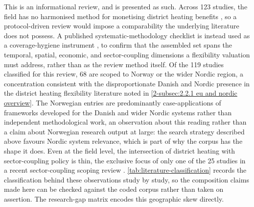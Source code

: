 This is an informational review, and is presented as such. Across 123 studies, the field has no harmonised method for monetising district heating benefits \cite{ahmed_district_2025}, so a protocol-driven review would impose a comparability the underlying literature does not possess. A published systematic-methodology checklist is instead used as a coverage-hygiene instrument \cite{atabaki_systematic_2025}, to confirm that the assembled set spans the temporal, spatial, economic, and sector-coupling dimensions a flexibility valuation must address, rather than as the review method itself. Of the 119 studies classified for this review, 68 are scoped to Norway or the wider Nordic region, a concentration consistent with the disproportionate Danish and Nordic presence in the district heating flexibility literature noted in \autoref{2-subsec:2.2.1 eu and nordic overview}. The Norwegian entries are predominantly case-applications of frameworks developed for the Danish and wider Nordic systems rather than independent methodological work, an observation about this reading rather than a claim about Norwegian research output at large: the search strategy described above favours Nordic system relevance, which is part of why the corpus has the shape it does. Even at the field level, the intersection of district heating with sector-coupling policy is thin, the exclusive focus of only one of the 25 studies in a recent sector-coupling scoping review \cite{vanhanen_energy_2024}. \autoref{tab:literature-classification} records the classification behind these observations study by study, so the composition claims made here can be checked against the coded corpus rather than taken on assertion. The research-gap matrix encodes this geographic skew directly.

